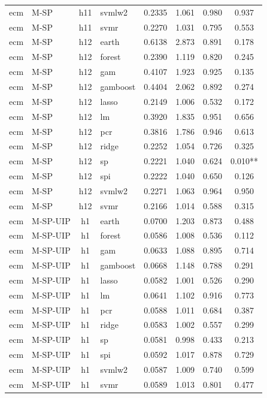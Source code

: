 \begin{ThreePartTable}
\begin{longtable}[t]{llclcccc}
ecm & M-SP & h11 & svmlw2 & 0.2335 & 1.061 & 0.980 & 0.937\\
ecm & M-SP & h11 & svmr & 0.2270 & 1.031 & 0.795 & 0.553\\
\addlinespace
ecm & M-SP & h12 & earth & 0.6138 & 2.873 & 0.891 & 0.178\\
ecm & M-SP & h12 & forest & 0.2390 & 1.119 & 0.820 & 0.245\\
ecm & M-SP & h12 & gam & 0.4107 & 1.923 & 0.925 & 0.135\\
ecm & M-SP & h12 & gamboost & 0.4404 & 2.062 & 0.892 & 0.274\\
ecm & M-SP & h12 & lasso & 0.2149 & 1.006 & 0.532 & 0.172\\
ecm & M-SP & h12 & lm & 0.3920 & 1.835 & 0.951 & 0.656\\
ecm & M-SP & h12 & pcr & 0.3816 & 1.786 & 0.946 & 0.613\\
ecm & M-SP & h12 & ridge & 0.2252 & 1.054 & 0.726 & 0.325\\
ecm & M-SP & h12 & sp & 0.2221 & 1.040 & 0.624 & 0.010**\\
ecm & M-SP & h12 & spi & 0.2222 & 1.040 & 0.650 & 0.126\\
ecm & M-SP & h12 & svmlw2 & 0.2271 & 1.063 & 0.964 & 0.950\\
ecm & M-SP & h12 & svmr & 0.2166 & 1.014 & 0.588 & 0.315\\
\addlinespace
ecm & M-SP-UIP & h1 & earth & 0.0700 & 1.203 & 0.873 & 0.488\\
ecm & M-SP-UIP & h1 & forest & 0.0586 & 1.008 & 0.536 & 0.112\\
ecm & M-SP-UIP & h1 & gam & 0.0633 & 1.088 & 0.895 & 0.714\\
ecm & M-SP-UIP & h1 & gamboost & 0.0668 & 1.148 & 0.788 & 0.291\\
ecm & M-SP-UIP & h1 & lasso & 0.0582 & 1.001 & 0.526 & 0.290\\
ecm & M-SP-UIP & h1 & lm & 0.0641 & 1.102 & 0.916 & 0.773\\
ecm & M-SP-UIP & h1 & pcr & 0.0588 & 1.011 & 0.684 & 0.387\\
ecm & M-SP-UIP & h1 & ridge & 0.0583 & 1.002 & 0.557 & 0.299\\
ecm & M-SP-UIP & h1 & sp & 0.0581 & 0.998 & 0.433 & 0.213\\
ecm & M-SP-UIP & h1 & spi & 0.0592 & 1.017 & 0.878 & 0.729\\
ecm & M-SP-UIP & h1 & svmlw2 & 0.0587 & 1.009 & 0.740 & 0.599\\
ecm & M-SP-UIP & h1 & svmr & 0.0589 & 1.013 & 0.801 & 0.477\\

\end{longtable}
\end{ThreePartTable}
